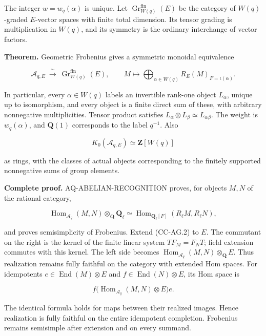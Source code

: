 \documentclass[11pt,a4paper]{article}
\theoremstyle{definition}\newtheorem{definition}[theorem]{Definition}
\theoremstyle{remark}\newtheorem{remark}[theorem]{Remark}
\begin{document}
The integer \(w=w_q(\alpha)\) is unique. Let
\(\operatorname{Gr}^{\mathrm{fin}}_{W(q)}(E)\) be the category of
\(W(q)\)-graded \(E\)-vector spaces with finite total dimension. Its
tensor grading is multiplication in \(W(q)\), and its symmetry is the
ordinary interchange of vector factors.

\textbf{Theorem.} Geometric Frobenius gives a symmetric monoidal
equivalence

\[
 \mathcal A_{q,E}\ \xrightarrow{\ \sim\ }\
 \operatorname{Gr}^{\mathrm{fin}}_{W(q)}(E),\qquad
 M\longmapsto
 \bigoplus_{\alpha\in W(q)}
 R_E(M)_{F=\iota(\alpha)}.                         \tag{CC-AG.1}
\]

In particular, every \(\alpha\in W(q)\) labels an invertible rank-one
object \(L_\alpha\), unique up to isomorphism, and every object is a
finite direct sum of these, with arbitrary nonnegative multiplicities.
Tensor product satisfies
\(L_\alpha\otimes L_\beta\simeq L_{\alpha\beta}\). The weight is
\(w_q(\alpha)\), and \(\mathbf Q(1)\) corresponds to the label
\(q^{-1}\). Also

\[
 K_0(\mathcal A_{q,E})\simeq\mathbf Z[W(q)]
\]

as rings, with the classes of actual objects corresponding to the
finitely supported nonnegative sums of group elements.

\textbf{Complete proof.} AQ-ABELIAN-RECOGNITION proves, for objects
\(M,N\) of the rational category,

\[
 \operatorname{Hom}_{\mathcal A_q}(M,N)
          \otimes_{\mathbf Q}\mathbf Q_\ell
 \simeq
 \operatorname{Hom}_{\mathbf Q_\ell[F]}
       (R_\ell M,R_\ell N),                       \tag{CC-AG.2}
\]

and proves semisimplicity of Frobenius. Extend (CC-AG.2) to \(E\). The
commutant on the right is the kernel of the finite linear system
\(TF_M=F_NT\); field extension commutes with this kernel. The left side
becomes \(\operatorname{Hom}_{\mathcal A_q}(M,N)\otimes_{\mathbf Q}E\).
Thus realization remains fully faithful on the category with extended
Hom spaces. For idempotents \(e\in\operatorname{End}(M)\otimes E\) and
\(f\in\operatorname{End}(N)\otimes E\), its Hom space is

\[
 f\bigl(\operatorname{Hom}_{\mathcal A_q}(M,N)\otimes E\bigr)e.
\]

The identical formula holds for maps between their realized images.
Hence realization is fully faithful on the entire idempotent completion.
Frobenius remains semisimple after extension and on every summand.
\end{document}
